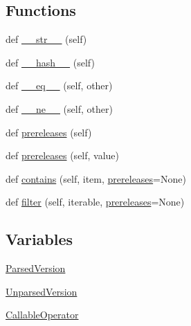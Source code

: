 \subsection*{Functions}
\begin{DoxyCompactItemize}
\item 
def \hyperlink{namespacesetuptools_1_1__vendor_1_1packaging_1_1specifiers_a340e34ea3a14fea865479251b42f4cce}{\+\_\+\+\_\+str\+\_\+\+\_\+} (self)
\item 
def \hyperlink{namespacesetuptools_1_1__vendor_1_1packaging_1_1specifiers_a111da414b1d7e03be2710b408dc4e113}{\+\_\+\+\_\+hash\+\_\+\+\_\+} (self)
\item 
def \hyperlink{namespacesetuptools_1_1__vendor_1_1packaging_1_1specifiers_aefedbe8229f26e1d8bf06655074f0f6b}{\+\_\+\+\_\+eq\+\_\+\+\_\+} (self, other)
\item 
def \hyperlink{namespacesetuptools_1_1__vendor_1_1packaging_1_1specifiers_a25b4dbbea17a3febfaef7260719119a7}{\+\_\+\+\_\+ne\+\_\+\+\_\+} (self, other)
\item 
def \hyperlink{namespacesetuptools_1_1__vendor_1_1packaging_1_1specifiers_acd7e22675e7864a719065c13ef9ef2b5}{prereleases} (self)
\item 
def \hyperlink{namespacesetuptools_1_1__vendor_1_1packaging_1_1specifiers_a7a68701f475c29180861f133212aef8f}{prereleases} (self, value)
\item 
def \hyperlink{namespacesetuptools_1_1__vendor_1_1packaging_1_1specifiers_a1e89282b60fb60c0e777df80f766fcb5}{contains} (self, item, \hyperlink{namespacesetuptools_1_1__vendor_1_1packaging_1_1specifiers_acd7e22675e7864a719065c13ef9ef2b5}{prereleases}=None)
\item 
def \hyperlink{namespacesetuptools_1_1__vendor_1_1packaging_1_1specifiers_a4f34c1386554f2f81a0520e07bf72e74}{filter} (self, iterable, \hyperlink{namespacesetuptools_1_1__vendor_1_1packaging_1_1specifiers_acd7e22675e7864a719065c13ef9ef2b5}{prereleases}=None)
\end{DoxyCompactItemize}
\subsection*{Variables}
\begin{DoxyCompactItemize}
\item 
\hyperlink{namespacesetuptools_1_1__vendor_1_1packaging_1_1specifiers_a3c5c48ac47966b584d5a131f77aa6744}{Parsed\+Version}
\item 
\hyperlink{namespacesetuptools_1_1__vendor_1_1packaging_1_1specifiers_a08703e0763efb9bf8d80739ce6ddcdea}{Unparsed\+Version}
\item 
\hyperlink{namespacesetuptools_1_1__vendor_1_1packaging_1_1specifiers_a3663763ac7530d761c935ac8e200c6a1}{Callable\+Operator}
\end{DoxyCompactItemize}


